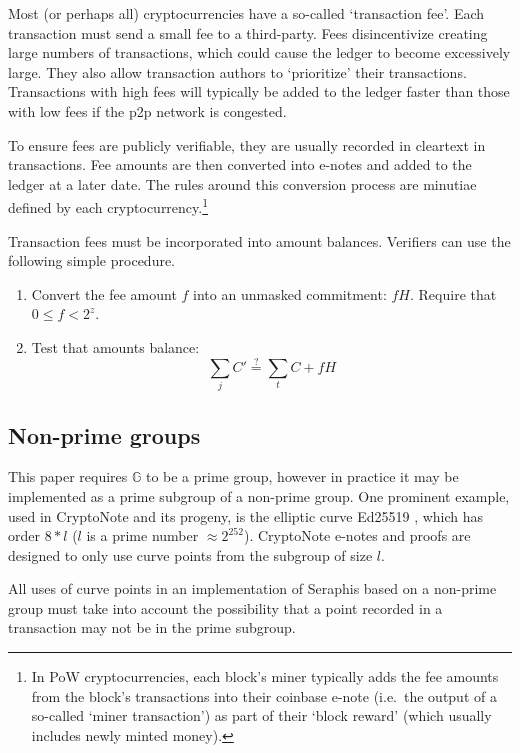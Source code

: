 Most (or perhaps all) cryptocurrencies have a so-called `transaction fee'. Each transaction must send a small fee to a third-party. Fees disincentivize creating large numbers of transactions, which could cause the ledger to become excessively large. They also allow transaction authors to `prioritize' their transactions. Transactions with high fees will typically be added to the ledger faster than those with low fees if the p2p network is congested.

To ensure fees are publicly verifiable, they are usually recorded in cleartext in transactions. Fee amounts are then converted into e-notes and added to the ledger at a later date. The rules around this conversion process are minutiae defined by each cryptocurrency.\footnote{In PoW cryptocurrencies, each block's miner typically adds the fee amounts from the block's transactions into their coinbase e-note (i.e.\ the output of a so-called `miner transaction') as part of their `block reward' (which usually includes newly minted money).}

Transaction fees must be incorporated into amount balances. Verifiers can use the following simple procedure.

\begin{enumerate}
    \item Convert the fee amount $f$ into an unmasked commitment: $f H$. Require that $0 \leq f < 2^z$.
    \item Test that amounts balance:
    \[\sum_j C' \stackrel{?}{=} \sum_t C + f H\]
\end{enumerate}


\subsection{Non-prime groups}
\label{subsec:implementers-non-prime-groups}

This paper requires $\mathbb{G}$ to be a prime group, however in practice it may be implemented as a prime subgroup of a non-prime group. One prominent example, used in CryptoNote \cite{cryptoNoteWhitePaper} and its progeny, is the elliptic curve Ed25519 \cite{Bernstein2012-high-speed-high-security-ed25519}, which has order $8*l$ ($l$ is a prime number $\approx 2^{252}$). CryptoNote e-notes and proofs are designed to only use curve points from the subgroup of size $l$.

All uses of curve points in an implementation of Seraphis based on a non-prime group must take into account the possibility that a point recorded in a transaction may not be in the prime subgroup.

